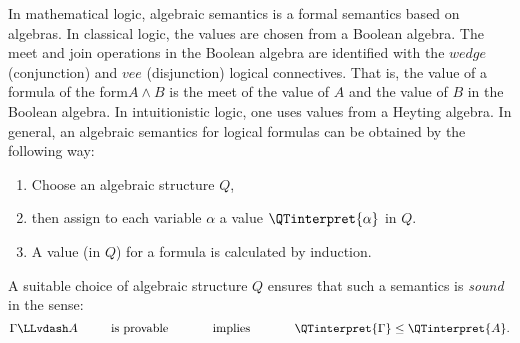 In mathematical logic, algebraic semantics is a formal semantics based on algebras. In classical logic, the values are chosen from a Boolean algebra.
The meet and join operations in the Boolean algebra are identified 
with the $wedge$ (conjunction) and $vee$ (disjunction) logical connectives.
That is, the value of a formula of the form$ A \wedge B$ is the meet 
of the value of $A$ and the value of $B$ in the Boolean algebra. 
In intuitionistic logic, one uses values from a Heyting algebra.
In general, an algebraic semantics for logical formulas can be obtained by the following way:
\begin{enumerate}
\item Choose an algebraic structure $Q$,
\item then assign to each variable $\alpha$ 
a value $\QTinterpret{\alpha}$ in $Q$.
\item A value (in $Q$)  for a formula is calculated by induction. 
\end{enumerate}
A suitable choice of algebraic structure $Q$ ensures that 
such a semantics is { \it sound } in the sense:
\[   \Gamma \LLvdash A \phantom{XXX} \mbox{is provable} 
\phantom{XXXX}\mbox{implies}\phantom{XXXX}
\QTinterpret{\Gamma} \leq \QTinterpret{A}.
\]
%
%

